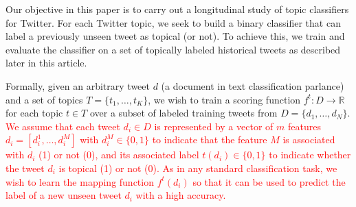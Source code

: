 Our objective in this paper is to carry out a longitudinal study of topic classifiers for Twitter.
For each Twitter topic, we seek to build a binary classifier that can label
a previously unseen tweet as topical (or not). 
To achieve this, we  train and evaluate the classifier on a set of topically labeled historical tweets as described later in this article.

Formally, given an arbitrary tweet $d$ (a document in text classification parlance) 
and a set of topics $T = \{
t_1,\ldots,t_K\}$, we wish to train a scoring function $f^t: D \rightarrow \mathbb{R}$
for each topic $t \in T$ over a subset of labeled training tweets from $D = \{
d_1,\ldots,d_N \}$. \textcolor{red}{  We assume that each tweet $d_i \in D$ is represented by a vector of $m$ features $d_i=[d_i^1,\ldots,d_i^M]$ with $d_i^M \in \{0,1\}$ to indicate that the feature $M$ is associated with $d_i$ (1) or not (0),  and its associated label $t(d_i) \in \{
0,1 \}$ to indicate whether the tweet $d_i$ is topical (1) or not (0).  
As in any standard classification task, we wish to learn the mapping function $ f^t(d_i)$ so that it can be used to predict the label of a new unseen tweet $d_i$ with a high accuracy.}


%

